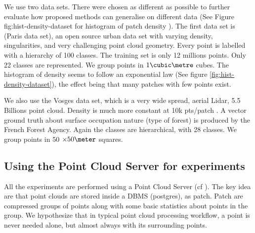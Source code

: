 		We use two data sets. There were chosen as different as possible to further evaluate how proposed methods can generalise on different data (See Figure fig:hist-density-dataset for histogram of patch density ). 
 		The first data set is \cite{IQmulus2014} (Paris data set), an open source urban data set with varying density, singularities, and very challenging point cloud geometry. 
 		Every point is labelled with a hierarchy of 100 classes.
 		The training set is only 12 millions points.
 		Only 22 classes are represented. We group points in $1 \cubic \metre$ cubes.
 		The histogram of density seems to follow an exponential law (See figure \ref{fig:hist-density-dataset}), the effect being that many patches with few points exist. 
 		
 		We also use the Vosges data set, which is a very wide spread, aerial Lidar, 5.5 Billions point cloud. 
 		Density is much more constant at 10k pts/patch .
 		A vector ground truth about surface occupation nature (type of forest) is produced by the French Forest Agency. Again the classes are hierarchical, with 28 classes. 
 		We group points in 50 $\times 50 \meter$ squares.
 		

	\subsection{Using the Point Cloud Server for experiments}
		All the experiments are performed using a Point Cloud Server (cf \cite{Cura2014}).
		The key idea are that point clouds are stored inside a DBMS (postgres), as patch. Patch are compressed groups of points along with some basic statistics about points in the group.
		We hypothesize that in typical point cloud processing workflow, a point is never needed alone, but almost always with its surrounding points.
	
